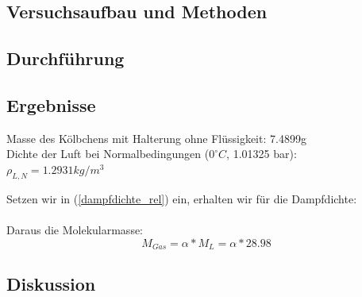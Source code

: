 \documentclass{article}
\begin{document}
\subsection{Versuchsaufbau und Methoden}
\subsection{Durchführung}
\subsection{Ergebnisse}

Masse des Kölbchens mit Halterung ohne Flüssigkeit: 7.4899g\\
Dichte der Luft bei Normalbedingungen ($0^\circ C$, 1.01325 bar):\\
$\rho_{L,N}=1.2931kg/m^3$

Setzen wir in (\ref{dampfdichte_rel}) ein, erhalten wir für die Dampfdichte:\\
\\
Daraus die Molekularmasse:\\
$$M_{Gas}=\alpha*M_L=\alpha*28.98$$

\subsection{Diskussion}
\end{document}
